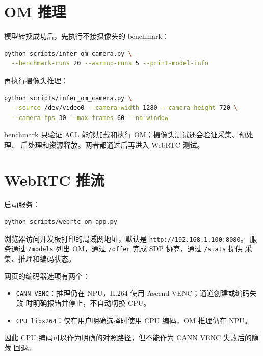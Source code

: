 \section{OM 推理}\label{om-ux63a8ux7406}

模型转换成功后，先执行不接摄像头的 benchmark：

\begin{lstlisting}[language=bash]
python scripts/infer_om_camera.py \
  --benchmark-runs 20 --warmup-runs 5 --print-model-info
\end{lstlisting}

再执行摄像头推理：

\begin{lstlisting}[language=bash]
python scripts/infer_om_camera.py \
  --source /dev/video0 --camera-width 1280 --camera-height 720 \
  --camera-fps 30 --max-frames 60 --no-window
\end{lstlisting}

benchmark 只验证 ACL 能够加载和执行 OM；摄像头测试还会验证采集、预处理、
后处理和资源释放。两者都通过后再进入 WebRTC 测试。

\section{WebRTC 推流}\label{webrtc-ux63a8ux6d41}

启动服务：

\begin{lstlisting}[language=bash]
python scripts/webrtc_om_app.py
\end{lstlisting}

浏览器访问开发板打印的局域网地址，默认是
\passthrough{\lstinline!http://192.168.1.100:8080!}。 服务通过
\passthrough{\lstinline!/models!} 列出 OM，通过
\passthrough{\lstinline!/offer!} 完成 SDP 协商，通过
\passthrough{\lstinline!/stats!} 提供 采集、推理和编码状态。

网页的编码器选项有两个：

\begin{itemize}
\tightlist
\item
  \passthrough{\lstinline!CANN VENC!}：推理仍在 NPU，H.264 使用 Ascend
  VENC；通道创建或编码失败 时明确报错并停止，不自动切换 CPU。
\item
  \passthrough{\lstinline!CPU libx264!}：仅在用户明确选择时使用 CPU
  编码，OM 推理仍在 NPU。
\end{itemize}

因此 CPU 编码可以作为明确的对照路径，但不能作为 CANN VENC 失败后的隐藏
回退。

